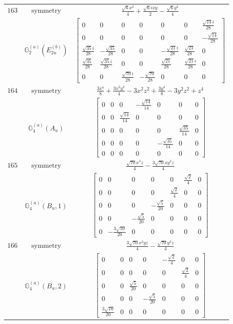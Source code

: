 \documentclass[fleqn,8pt,landscape]{jsarticle}
\begin{document}
\begin{longtable}{ccc}
$ 163 $ & $ \text{symmetry} $ & $ \frac{\sqrt{6} x^{2}}{4} + \frac{\sqrt{6} i x y}{2} - \frac{\sqrt{6} y^{2}}{4} $ \\
$  $ & $ \mathbb{G}_{2}^{(a)}(E_{2u}^{(b)}) $ & $ \begin{bmatrix} 0 & 0 & 0 & 0 & 0 & 0 & \frac{\sqrt{14} i}{28} \\ 0 & 0 & 0 & 0 & 0 & 0 & - \frac{\sqrt{14}}{28} \\ \frac{\sqrt{35} i}{28} & - \frac{\sqrt{35}}{28} & 0 & 0 & - \frac{\sqrt{21} i}{28} & \frac{\sqrt{21}}{28} & 0 \\ \frac{\sqrt{35}}{28} & \frac{\sqrt{35} i}{28} & 0 & 0 & \frac{\sqrt{21}}{28} & \frac{\sqrt{21} i}{28} & 0 \\ 0 & 0 & \frac{\sqrt{70} i}{28} & - \frac{\sqrt{70}}{28} & 0 & 0 & 0 \end{bmatrix} $ \\ \hline
$ 164 $ & $ \text{symmetry} $ & $ \frac{3 x^{4}}{8} + \frac{3 x^{2} y^{2}}{4} - 3 x^{2} z^{2} + \frac{3 y^{4}}{8} - 3 y^{2} z^{2} + z^{4} $ \\
$  $ & $ \mathbb{G}_{4}^{(a)}(A_{u}) $ & $ \begin{bmatrix} 0 & 0 & 0 & - \frac{\sqrt{14}}{14} & 0 & 0 & 0 \\ 0 & 0 & \frac{\sqrt{14}}{14} & 0 & 0 & 0 & 0 \\ 0 & 0 & 0 & 0 & 0 & \frac{\sqrt{35}}{14} & 0 \\ 0 & 0 & 0 & 0 & - \frac{\sqrt{35}}{14} & 0 & 0 \\ 0 & 0 & 0 & 0 & 0 & 0 & 0 \end{bmatrix} $ \\ \hline
$ 165 $ & $ \text{symmetry} $ & $ \frac{\sqrt{70} x^{3} z}{4} - \frac{3 \sqrt{70} x y^{2} z}{4} $ \\
$  $ & $ \mathbb{G}_{4}^{(a)}(B_{u},1) $ & $ \begin{bmatrix} 0 & 0 & 0 & 0 & 0 & \frac{\sqrt{2}}{4} & 0 \\ 0 & 0 & 0 & 0 & \frac{\sqrt{2}}{4} & 0 & 0 \\ 0 & 0 & 0 & - \frac{\sqrt{5}}{20} & 0 & 0 & 0 \\ 0 & 0 & - \frac{\sqrt{5}}{20} & 0 & 0 & 0 & 0 \\ 0 & - \frac{3 \sqrt{10}}{20} & 0 & 0 & 0 & 0 & 0 \end{bmatrix} $ \\ \hline
$ 166 $ & $ \text{symmetry} $ & $ \frac{3 \sqrt{70} x^{2} y z}{4} - \frac{\sqrt{70} y^{3} z}{4} $ \\
$  $ & $ \mathbb{G}_{4}^{(a)}(B_{u},2) $ & $ \begin{bmatrix} 0 & 0 & 0 & 0 & - \frac{\sqrt{2}}{4} & 0 & 0 \\ 0 & 0 & 0 & 0 & 0 & \frac{\sqrt{2}}{4} & 0 \\ 0 & 0 & \frac{\sqrt{5}}{20} & 0 & 0 & 0 & 0 \\ 0 & 0 & 0 & - \frac{\sqrt{5}}{20} & 0 & 0 & 0 \\ \frac{3 \sqrt{10}}{20} & 0 & 0 & 0 & 0 & 0 & 0 \end{bmatrix} $ \\ \hline

\end{longtable}
\end{document}
